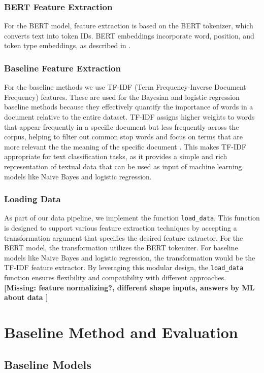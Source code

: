 \documentclass[10pt,a4paper,oneside]{article} %
\begin{document}
\subsubsection{BERT Feature Extraction}
For the BERT model, feature extraction is based on the BERT tokenizer, which converts text into token IDs. BERT embeddings incorporate word, position, and token type embeddings, as described in \cite{kenton2019bert}. 
\subsubsection{Baseline Feature Extraction}
For the baseline methods we use TF-IDF (Term Frequency-Inverse Document Frequency) features. These are used for the Bayesian and logistic regression baseline methods because they effectively quantify the importance of words in a document relative to the entire dataset. TF-IDF assigns higher weights to words that appear frequently in a specific document but less frequently across the corpus, helping to filter out common stop words and focus on terms that are more relevant the the meaning of the specific document \citep{sparck1972statistical}. This makes TF-IDF appropriate for text classification tasks, as it provides a simple and rich representation of textual data that can be used as input of machine learning models like Naive Bayes and logistic regression.
\subsubsection{Loading Data}
As part of our data pipeline, we implement the function \texttt{load\_data}. This function is designed to support various feature extraction techniques by accepting a transformation argument that specifies the desired feature extractor. For the BERT model, the transformation utilizes the BERT tokenizer.  For baseline models like Naive Bayes and logistic regression, the transformation would be the TF-IDF feature extractor. By leveraging this modular design, the \verb|load_data| function ensures flexibility and compatibility with different approaches.
\textbf{[Missing: feature normalizing?, different shape inputs,  answers by ML about data ]}

\section{Baseline Method and Evaluation}
\subsection{Baseline Models}
\end{document}
